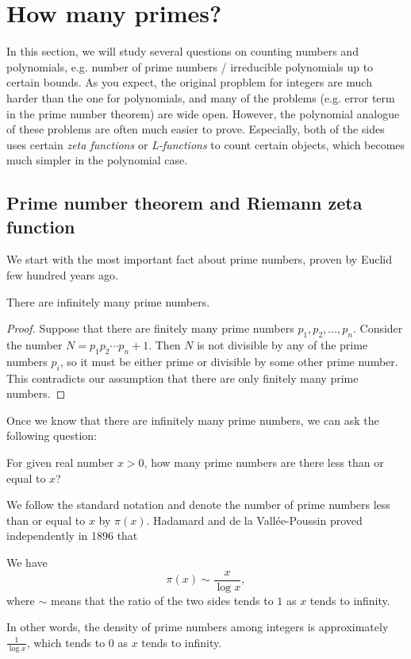 \section{How many primes?}
\label{sec:how-many-primes}

In this section, we will study several questions on counting numbers and polynomials, e.g. number of prime numbers / irreducible polynomials up to certain bounds.
As you expect, the original propblem for integers are much harder than the one for polynomials, and many of the problems (e.g. error term in the prime number theorem) are wide open.
However, the polynomial analogue of these problems are often much easier to prove.
Especially, both of the sides uses certain \emph{zeta functions} or \emph{L-functions} to count certain objects, which becomes much simpler in the polynomial case.

\subsection{Prime number theorem and Riemann zeta function}
\label{subsec:prime-number-theorem}

We start with the most important fact about prime numbers, proven by Euclid few hundred years ago.
\begin{theorem}[Euclid]
    \label{thm:euclid}
    There are infinitely many prime numbers.
\end{theorem}
\begin{proof}
    Suppose that there are finitely many prime numbers $p_1, p_2, \dots, p_n$.
    Consider the number $N = p_1 p_2 \cdots p_n + 1$.
    Then $N$ is not divisible by any of the prime numbers $p_i$, so it must be either prime or divisible by some other prime number.
    This contradicts our assumption that there are only finitely many prime numbers.
\end{proof}

Once we know that there are infinitely many prime numbers, we can ask the following question:

\begin{myquote}
    For given real number $x > 0$, how many prime numbers are there less than or equal to $x$?
\end{myquote}

We follow the standard notation and denote the number of prime numbers less than or equal to $x$ by $\pi(x)$.
Hadamard and de la Vall\'ee-Poussin proved independently in 1896 that
\begin{theorem}
    \label{thm:prime-number-theorem}
    We have
    \[
        \pi(x) \sim \frac{x}{\log x},
    \]
    where $\sim$ means that the ratio of the two sides tends to $1$ as $x$ tends to infinity.
\end{theorem}
In other words, the density of prime numbers among integers is approximately $\frac{1}{\log x}$, which tends to $0$ as $x$ tends to infinity.


